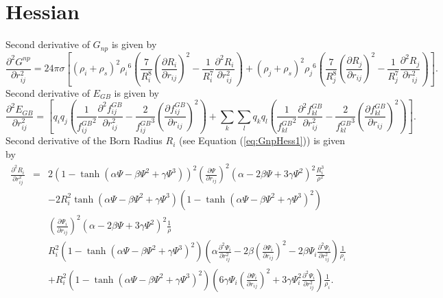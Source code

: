\documentclass[12pt]{article}
\begin{document}
\section{Hessian}
Second derivative of $G_{np}$ is given by
\begin{equation}
\label{eq:GnpHess1}
\frac{\partial^{2} G^{np}}{\partial r_{ij}^{2}} = 24{\pi}{\sigma}\left[ ({\rho}_{i} + {\rho}_{s})^{2}{\rho_{i}}^{6}
\left(\frac{7}{R_{i}^{8}}\left(\frac{\partial R_{i}}{\partial r_{ij}}\right)^{2} - \frac{1}{R_{i}^{7}}\frac{\partial^{2}R_{i}}{\partial r_{ij}^{2}}\right)+ ({\rho}_{j} + {\rho}_{s})^{2}{\rho_{j}}^{6} \left(\frac{7}{R_{j}^{8}}\left(\frac{\partial R_{j}}{\partial r_{ij}}\right)^{2} - \frac{1}{R_{j}^{7}} \frac{\partial^{2}R_{j}}{\partial r_{ij}^{2}}\right) \right]. 
\end{equation}
Second derivative of $E_{GB}$ is given by
\begin{equation}
\frac{\partial^{2} E_{GB}}{\partial r_{ij}^{2}} = \left[ q_{i}q_{j}\left(\frac{1}{{f_{ij}^{GB}}^{2}}\frac{\partial^{2}f_{ij}^{GB}}{\partial r_{ij}^{2}} - \frac{2}{{f_{ij}^{GB}}^{3}}\left(\frac{\partial f_{ij}^{GB}}{\partial r_{ij}}\right)^{2} \right) + \displaystyle\sum_{k}\displaystyle\sum_{l}q_{k}q_{l} \left( \frac{1}{{f_{kl}^{GB}}^{2}}\frac{\partial^{2}f_{kl}^{GB}}{\partial r_{ij}^{2}} - \frac{2}{{f_{kl}^{GB}}^{3}}\left(\frac{\partial f_{kl}^{GB}}{\partial r_{ij}}\right)^{2}\right) \right].
\end{equation}
Second derivative of the Born Radius $R_{i}$ (see Equation (\ref{eq:GnpHess1})) is given by
\begin{eqnarray}
\frac{\partial^{2}R_{i}}{\partial r_{ij}^{2}} & = & 2(1 - \tanh({\alpha}{\Psi} - {\beta}{\Psi}^{2} + {\gamma}{\Psi}^{3}))^{2}(\frac{\partial {\Psi}}{\partial r_{ij}})^{2}({\alpha} - 2{\beta}{\Psi} + 3{\gamma}{\Psi}^{2})^{2}\frac{R_{i}^{3}}{\rho^{2}} \\ \nonumber
& & - 2R_{i}^{2} \tanh({\alpha}{\Psi} - {\beta}{\Psi}^{2} + {\gamma}{\Psi}^{3})(1 -{\tanh({\alpha}{\Psi} - {\beta}{\Psi}^{2} + {\gamma}{\Psi}^{3})}^{2})\\ \nonumber 
& &\left(\frac{\partial {\Psi}_{i}}{\partial r_{ij}}\right)^{2}({\alpha} - 2{\beta}{\Psi} + 3{\gamma}{\Psi}^{2})^{2}\frac{1}{\rho} \\ \nonumber
& & R_{i}^{2}(1 - \tanh({\alpha}{\Psi} - {\beta}{\Psi}^{2} + {\gamma}{\Psi}^{3})^{2})({\alpha}\frac{\partial^{2}{\Psi}_{i}}{\partial r_{ij}^{2}} - 2{\beta}(\frac{\partial {\Psi}_{i}}{\partial r_{ij}})^{2} - 2{\beta}{\Psi}_{i}\frac{\partial^{2}{\Psi}_{i}}{\partial r_{ij}^{2}})\frac{1}{{\rho}_{i}} \\ \nonumber
& & +R_{i}^{2}(1 - \tanh({\alpha}{\Psi} - {\beta}{\Psi}^{2} + {\gamma}{\Psi}^{3})^{2})( 6{\gamma}{\Psi}_{i}(\frac{\partial {\Psi}_{i}}{\partial r_{ij}})^{2} + 3{\gamma}{\Psi}_{i}^{2}\frac{\partial^{2}{\Psi}_{i}}{\partial r_{ij}^{2}})\frac{1}{{\rho}_{i}}.
\end{eqnarray}
\end{document}
